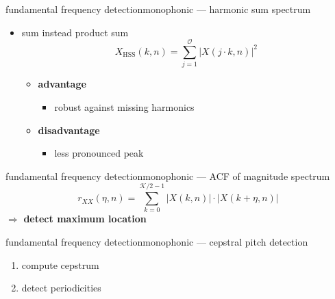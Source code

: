 	\begin{frame}{fundamental frequency detection}{monophonic --- harmonic sum spectrum}
        \begin{itemize}
            \item   sum instead product sum
        \begin{equation*}\label{eq:hss}
            X_{\mathrm{HSS}}(k,n) = \sum\limits_{j=1}^{\mathcal{O}}{|X(j\cdot k,n)|^2} 
        \end{equation*}
        \bigskip

                \begin{itemize}
                    \item<2->   \textbf{advantage}
                        \begin{itemize}
                            \item   robust against missing harmonics
                        \end{itemize}
                    \item<3->   \textbf{disadvantage}
                        \begin{itemize}
                            \item   less pronounced peak
                        \end{itemize}
                \end{itemize}
        \end{itemize}
	\end{frame}
	
	\begin{frame}{fundamental frequency detection}{monophonic --- ACF of magnitude spectrum}
		\begin{equation*}
			r_{XX}(\eta,n) = \sum\limits_{k=0}^{\mathcal{K}/2-1}{|X(k,n)|\cdot |X(k+\eta,n)|}
		\end{equation*}
		\pause
		$\Rightarrow$ \textbf{detect maximum location}

	\end{frame}
	
	\begin{frame}{fundamental frequency detection}{monophonic --- cepstral pitch detection}
		\begin{enumerate}
			\item	compute cepstrum
			\item	detect periodicities
		\end{enumerate}
	\end{frame}
	
